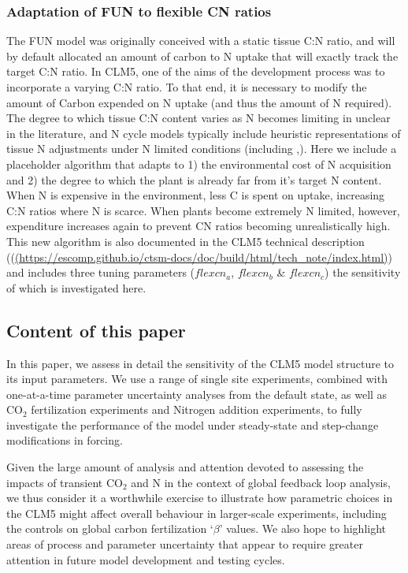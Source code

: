 \documentclass[draft,linenumbers]{agujournal}
\begin{document}
\subsubsection{Adaptation of FUN to flexible CN ratios}

The FUN model was originally conceived with a static tissue C:N ratio, and will by default allocated an amount of carbon to N uptake that will exactly track the target C:N ratio. In CLM5, one of the aims of the development process was to incorporate a varying C:N ratio. To that end, it is necessary to modify the amount of Carbon expended on N uptake (and thus the amount of N required). The degree to which tissue C:N content varies as N becomes limiting in unclear in the literature, and N cycle models typically include heuristic representations of tissue N adjustments under N limited conditions (including \cite{zaehle2010},\cite{ghimire2016}). Here we include a placeholder algorithm that adapts to 1) the environmental cost of N acquisition and 2) the degree to which the plant is already far from it's target N content. When N is expensive in the environment, less C is spent on uptake, increasing C:N ratios where N is scarce. When plants become extremely N limited, however, expenditure increases again to prevent CN ratios becoming unrealistically high. This new algorithm is also documented in the CLM5 technical description ((\url{(https://escomp.github.io/ctsm-docs/doc/build/html/tech_note/index.html)}) and includes three tuning parameters ($flexcn_{a}$, $flexcn_{b}$ \& $flexcn_{c}$) the sensitivity of which is investigated here.


\subsection{Content of this paper}

In this paper, we assess in detail the sensitivity of the CLM5 model structure to its input parameters. We use a range of single site experiments, combined with one-at-a-time parameter uncertainty analyses from the default state, as well as CO$_{2}$ fertilization experiments and Nitrogen addition experiments, 
to fully investigate the performance of the model under steady-state and step-change modifications in forcing.

Given the large amount of analysis and attention devoted to assessing the impacts of transient CO$_{2}$ and N in the context of global feedback loop analysis, we thus consider it a worthwhile exercise to illustrate how parametric choices in the CLM5 might affect overall behaviour in larger-scale experiments, including the controls on global carbon fertilization `$\beta$' values. We also hope to highlight areas of process and parameter uncertainty that appear to require greater attention in future model development and testing cycles. 
\end{document}
